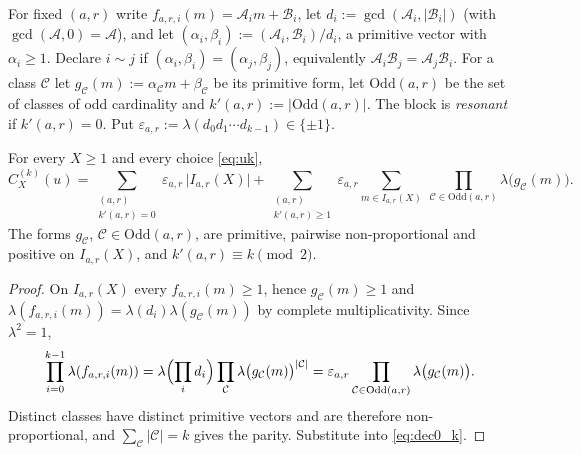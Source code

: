 \begin{definition}
\label{def:classes}
For fixed $(a,r)$ write $f_{a,r,i}(m)=\mathcal A_im+\mathcal B_i$, let $d_i:=\gcd(\mathcal A_i,|\mathcal B_i|)$ (with $\gcd(\mathcal A,0)=\mathcal A$), and let $(\alpha_i,\beta_i):=(\mathcal A_i,\mathcal B_i)/d_i$, a primitive vector with $\alpha_i\ge1$. Declare $i\sim j$ if $(\alpha_i,\beta_i)=(\alpha_j,\beta_j)$, equivalently $\mathcal A_i\mathcal B_j=\mathcal A_j\mathcal B_i$. For a class $\mathcal C$ let $g_{\mathcal C}(m):=\alpha_{\mathcal C}m+\beta_{\mathcal C}$ be its primitive form, let $\mathrm{Odd}(a,r)$ be the set of classes of odd cardinality and $k'(a,r):=|\mathrm{Odd}(a,r)|$. The block is \emph{resonant} if $k'(a,r)=0$. Put $\varepsilon_{a,r}:=\lambda(d_0d_1\cdots d_{k-1})\in\{\pm1\}$.
\end{definition}

\begin{theorem}
\label{thm:dec_k}
For every $X\ge1$ and every choice \eqref{eq:uk},
\begin{equation}
C^{(k)}_X(u)=\sum_{\substack{(a,r)\\ k'(a,r)=0}}\varepsilon_{a,r}\,\bigl|I_{a,r}(X)\bigr|
+\sum_{\substack{(a,r)\\ k'(a,r)\ge1}}\varepsilon_{a,r}\sum_{m\in I_{a,r}(X)}\ \prod_{\mathcal C\in\mathrm{Odd}(a,r)}\lambda\bigl(g_{\mathcal C}(m)\bigr).
\label{eq:dec_k}
\end{equation}
The forms $g_{\mathcal C}$, $\mathcal C\in\mathrm{Odd}(a,r)$, are primitive, pairwise non-proportional and positive on $I_{a,r}(X)$, and $k'(a,r)\equiv k\pmod 2$.
\end{theorem}

\begin{proof}
On $I_{a,r}(X)$ every $f_{a,r,i}(m)\ge1$, hence $g_{\mathcal C}(m)\ge1$ and $\lambda(f_{a,r,i}(m))=\lambda(d_i)\lambda(g_{\mathcal C}(m))$ by complete multiplicativity. Since $\lambda^2=1$,
\begin{equation}
\prod_{i=0}^{k-1}\lambda(f_{a,r,i}(m))=\lambda\Bigl(\prod_i d_i\Bigr)\prod_{\mathcal C}\lambda\bigl(g_{\mathcal C}(m)\bigr)^{|\mathcal C|}=\varepsilon_{a,r}\prod_{\mathcal C\in\mathrm{Odd}(a,r)}\lambda\bigl(g_{\mathcal C}(m)\bigr).
\label{eq:collapse}
\end{equation}
Distinct classes have distinct primitive vectors and are therefore non-proportional, and $\sum_{\mathcal C}|\mathcal C|=k$ gives the parity. Substitute into \eqref{eq:dec0_k}.
\end{proof}

